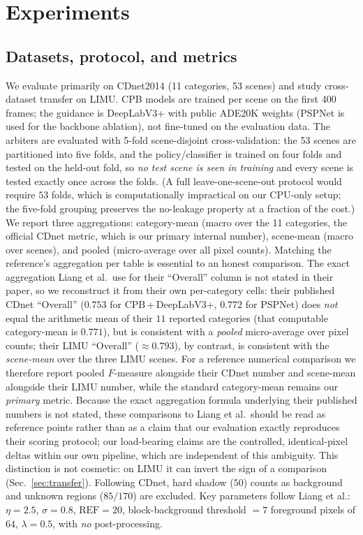 \documentclass[sn-basic]{sn-jnl}
\newcommand{\Fm}{$F$-measure}
\begin{document}
\section{Experiments}
\label{sec:exp}

\subsection{Datasets, protocol, and metrics}
\label{sec:protocol}
We evaluate primarily on CDnet2014 (11 categories, 53 scenes) and study
cross-dataset transfer on LIMU. CPB models are trained per scene on the first 400
frames; the guidance is DeepLabV3+ with public ADE20K weights (PSPNet is used for
the backbone ablation), not fine-tuned on the evaluation data. The arbiters are
evaluated with 5-fold scene-disjoint cross-validation: the 53 scenes are partitioned
into five folds, and the policy/classifier is trained on four folds and tested on the
held-out fold, so \emph{no test scene is seen in training} and every scene is tested
exactly once across the folds. (A full leave-one-scene-out protocol would require $53$
folds, which is computationally impractical on our CPU-only setup; the five-fold
grouping preserves the no-leakage property at a fraction of the cost.)
We report three aggregations: category-mean (macro over the 11 categories, the
official CDnet metric, which is our primary internal number), scene-mean (macro over
scenes), and pooled (micro-average over all pixel counts). Matching the reference's
aggregation per table is essential to an honest comparison. The exact aggregation
Liang et al.\ use for their ``Overall'' column is not stated in their paper, so we
reconstruct it from their own per-category cells: their published CDnet ``Overall''
($0.753$ for CPB\,+\,DeepLabV3+, $0.772$ for PSPNet) does \emph{not} equal the
arithmetic mean of their $11$ reported categories (that computable category-mean is
$0.771$), but is consistent with a \emph{pooled} micro-average over pixel counts; their
LIMU ``Overall'' ($\approx0.793$), by contrast, is consistent with the \emph{scene-mean}
over the three LIMU scenes. For a reference numerical comparison we therefore report pooled
\Fm{} alongside their CDnet number and scene-mean alongside their LIMU number, while the
standard category-mean remains our \emph{primary} metric. Because the exact aggregation
formula underlying their published numbers is not stated, these comparisons to Liang et
al.\ should be read as reference points rather than as a claim that our evaluation
exactly reproduces their scoring protocol; our load-bearing claims are the controlled,
identical-pixel deltas within our own pipeline, which are independent of this ambiguity.
This distinction is not cosmetic: on LIMU it can invert the sign of a comparison
(Sec.~\ref{sec:transfer}). Following
CDnet, hard shadow ($50$) counts as background and unknown regions ($85/170$) are
excluded. Key parameters follow Liang et al.: $\eta=2.5$, $\sigma=0.8$,
$\mathrm{REF}=20$, block-background threshold $=7$ foreground pixels of $64$,
$\lambda=0.5$, with \emph{no} post-processing.
\end{document}
